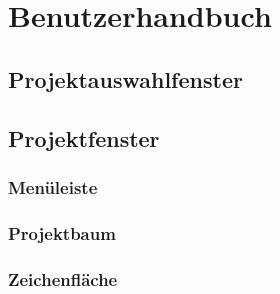 
\section{Benutzerhandbuch}

\subsection{Projektauswahlfenster}

\subsection{Projektfenster}
\subsubsection{Menüleiste}
\subsubsection{Projektbaum}
\subsubsection{Zeichenfläche}
